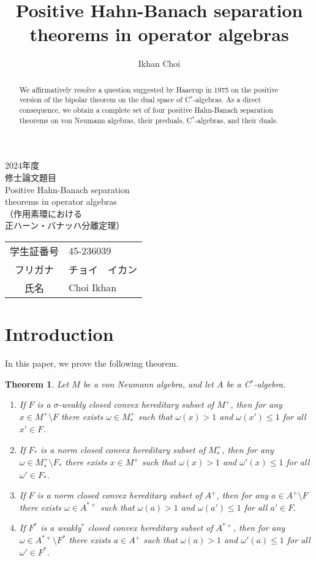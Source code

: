 \documentclass[noamsfonts,a4paper,10pt]{amsart}
\title{Positive Hahn-Banach separation theorems in operator algebras}
\author{Ikhan Choi}
\theoremstyle{plain}
\newtheorem*{thm*}{Theorem}
\theoremstyle{definition}
\theoremstyle{remark}
\begin{document}
\begin{center}
{\huge 2024年度}\\[36pt]
{\Huge 修士論文題目}\\[24pt]
{\Huge Positive Hahn-Banach separation\\[8pt]
theorems in operator algebras}\\[24pt]
{\huge （作用素環における\\[8pt]正ハーン・バナッハ分離定理）}
\vfill
\begin{tabular}{cl}
{\LARGE 学生証番号} & {\LARGE 45-236039}\\[8pt]
フリガナ & チョイ　イカン\\[8pt]
{\LARGE 氏名} & {\LARGE Choi Ikhan}\\[24pt]
\end{tabular}
\end{center}
\thispagestyle{empty}
\addtocounter{page}{-1}


\newpage

\begin{abstract}
We affirmatively resolve a question suggested by Haaerup in 1975 on the positive version of the bipolar theorem on the dual space of C$^*$-algebras.
As a direct consequence, we obtain a complete set of four positive Hahn-Banach separation theorems on von Neumann algebras, their preduals, C$^*$-algebras, and their duals.
\end{abstract}

\maketitle

\section{Introduction}

In this paper, we prove the following theorem.

\begin{thm*}
Let $M$ be a von Neumann algebra, and let $A$ be a C$^*$-algebra.
\begin{enumerate}
\item If $F$ is a $\sigma$-weakly closed convex hereditary subset of $M^+$, then for any $x\in M^+\setminus F$ there exists $\omega\in M_*^+$ such that $\omega(x)>1$ and $\omega(x')\le1$ for all $x'\in F$.
\item If $F_*$ is a norm closed convex hereditary subset of $M_*^+$, then for any $\omega\in M_*^+\setminus F_*$ there exists $x\in M^+$ such that $\omega(x)>1$ and $\omega'(x)\le1$ for all $\omega'\in F_*$.
\item If $F$ is a norm closed convex hereditary subset of $A^+$, then for any $a\in A^+\setminus F$\quad there exists $\omega\in A^{*+}$ such that $\omega(a)>1$ and $\omega(a')\le1$ for all $a'\in F$.
\item If $F^*$ is a weakly$^*$ closed convex hereditary subset of $A^{*+}$, then for any $\omega\in A^{*+}\setminus F^*$ there exists $a\in A^+$ such that $\omega(a)>1$ and $\omega'(a)\le1$ for all $\omega'\in F^*$.
\end{enumerate}
\end{thm*}
\end{document}
